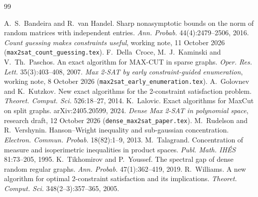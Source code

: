 \documentclass[11pt,a4paper]{article}
\theoremstyle{definition}
\theoremstyle{remark}
\begin{document}
\begin{thebibliography}{99}
\small\raggedright
{} A.~S.~Bandeira and R.~van Handel. Sharp nonasymptotic bounds on
 the norm of random matrices with independent entries. \emph{Ann. Probab.}
 44(4):2479--2506, 2016.
 \emph{Count guessing makes constraints useful}, working note,
 11 October 2026 (\texttt{max2sat\_count\_guessing.tex}).
 F.~Della~Croce, M.~J.~Kaminski and V.~Th.~Paschos. An exact
 algorithm for MAX-CUT in sparse graphs. \emph{Oper. Res. Lett.} 35(3):403--408,
 2007.
 \emph{Max 2-SAT by early constraint-guided enumeration}, working
 note, 8 October 2026 (\texttt{max2sat\_early\_enumeration.tex}).
 A.~Golovnev and K.~Kutzkov. New exact algorithms for the
 2-constraint satisfaction problem. \emph{Theoret. Comput. Sci.} 526:18--27, 2014.
 K.~Lalovic. Exact algorithms for MaxCut on split graphs.
 arXiv:2405.20599, 2024.
 \emph{Dense Max 2-SAT in polynomial space}, research draft,
 12 October 2026 (\texttt{dense\_max2sat\_paper.tex}).
 M.~Rudelson and R.~Vershynin. Hanson--Wright inequality and
 sub-gaussian concentration. \emph{Electron. Commun. Probab.} 18(82):1--9, 2013.
 M.~Talagrand. Concentration of measure and isoperimetric
 inequalities in product spaces. \emph{Publ. Math. IH\'ES} 81:73--205, 1995.
 K.~Tikhomirov and P.~Youssef. The spectral gap of dense random
 regular graphs. \emph{Ann. Probab.} 47(1):362--419, 2019.
 R.~Williams. A new algorithm for optimal 2-constraint
 satisfaction and its implications. \emph{Theoret. Comput. Sci.}
 348(2--3):357--365, 2005.
\end{thebibliography}
\end{document}
